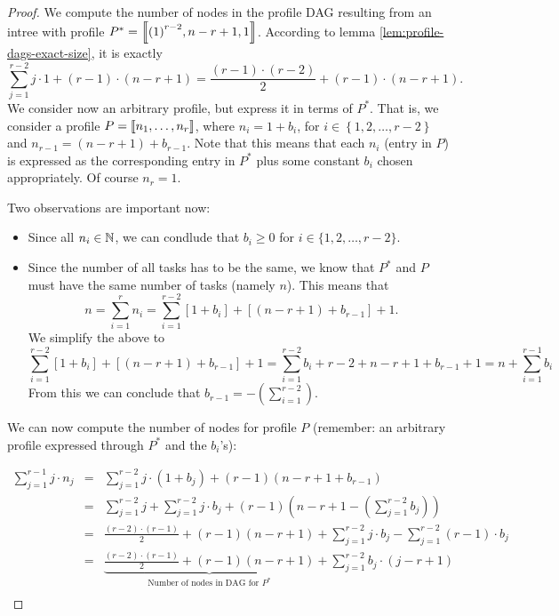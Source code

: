 \begin{proof}
  We compute the number of nodes in the profile DAG resulting from an intree with profile $P^*= \left\llbracket {(1)}^{r-2},n-r+1,1 \right\rrbracket$. According to lemma  \ref{lem:profile-dags-exact-size}, it is exactly
  \begin{equation*}
    \sum_{j=1}^{r-2} j\cdot 1 + (r-1)\cdot(n-r+1) = \frac{(r-1)\cdot(r-2)}{2} + (r-1)\cdot(n-r+1).
  \end{equation*}
  We consider now an arbitrary profile, but express it in terms of $P^*$. That is, we consider a profile $P=\left\llbracket n_1,\dots,n_r \right\rrbracket$, where $n_i = 1 + b_i$, for $i\in\left\{1,2,\dots,r-2\right\}$ and $n_{r-1} = (n-r+1) + b_{r-1}$. Note that this means that each $n_i$ (entry in $P$) is expressed as the corresponding entry in $P^*$ plus some constant $b_i$ chosen appropriately. Of course $n_r = 1$.

  Two observations are important now:

  \begin{itemize}
  \item Since all $n_i \in \mathbb{N}$, we can condlude that $b_i \geq 0$ for $i\in\{1,2,\dots,r-2\}$.
  \item Since the number of all tasks has to be the same, we know that $P^*$ and $P$ must have the same number of tasks (namely $n$). This means that
    \begin{equation*}
      n = \sum_{i=1}^r n_i = \sum_{i=1}^{r-2} \left[ 1+b_i \right] + \left[(n-r+1)+b_{r-1} \right] + 1.
    \end{equation*}
    We simplify the above to
    \begin{equation*}
      \sum_{i=1}^{r-2} \left[ 1+b_i \right] + \left[(n-r+1)+b_{r-1} \right] + 1 =
      \sum_{i=1}^{r-2} b_i + r-2 + n-r+1+b_{r-1}+1 = 
      n + \sum_{i=1}^{r-1} b_i
    \end{equation*}
    From this we can conclude that $b_{r-1} = -(\sum_{i=1}^{r-2})$.
  \end{itemize}

  We can now compute the number of nodes for profile $P$ (remember: an arbitrary profile expressed through $P^*$ and the $b_i$'s):

  \begin{eqnarray*}
    \sum_{j=1}^{r-1} j \cdot n_j &=& \sum_{j=1}^{r-2} j\cdot (1+b_j) + (r-1)(n-r+1+b_{r-1}) \\
    &=& \sum_{j=1}^{r-2} j + \sum_{j=1}^{r-2} j\cdot b_j + (r-1)\left(n-r+1-(\sum_{j=1}^{r-2} b_j)\right) \\
    &=& \frac{(r-2)\cdot(r-1)}{2} + (r-1)(n-r+1) + \sum_{j=1}^{r-2} j\cdot b_j - \sum_{j=1}^{r-2} (r-1) \cdot b_j \\
    &=& \underbrace{\frac{(r-2)\cdot(r-1)}{2} + (r-1)(n-r+1)}_{\text{Number of nodes in DAG for $P^*$}} + \sum_{j=1}^{r-2} b_j \cdot (j-r+1) \\
  \end{eqnarray*}
  

\end{proof}

